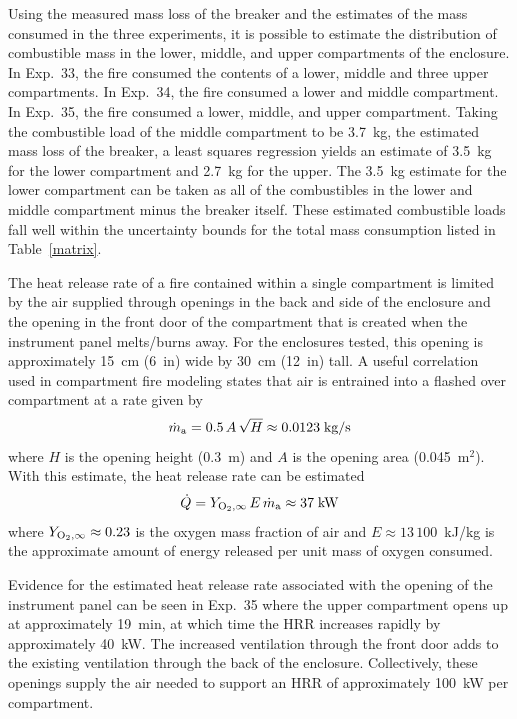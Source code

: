 \documentclass[12pt]{article}
\begin{document}
Using the measured mass loss of the breaker and the estimates of the mass consumed in the three experiments, it is possible to estimate the distribution of combustible mass in the lower, middle, and upper compartments of the enclosure. In Exp.~33, the fire consumed the contents of a lower, middle and three upper compartments. In Exp.~34, the fire consumed a lower and middle compartment. In Exp.~35, the fire consumed a lower, middle, and upper compartment. Taking the combustible load of the middle compartment to be 3.7~kg, the estimated mass loss of the breaker, a least squares regression yields an estimate of 3.5~kg for the lower compartment and 2.7~kg for the upper. The 3.5~kg estimate for the lower compartment can be taken as all of the combustibles in the lower and middle compartment minus the breaker itself. These estimated combustible loads fall well within the uncertainty bounds for the total mass consumption listed in Table~\ref{matrix}.

The heat release rate of a fire contained within a single compartment is limited by the air supplied through openings in the back and side of the enclosure and the opening in the front door of the compartment that is created when the instrument panel melts/burns away. For the enclosures tested, this opening is approximately 15~cm (6~in) wide by 30~cm (12~in) tall. A useful correlation~\cite{SFPE:Walton} used in compartment fire modeling states that air is entrained into a flashed over compartment at a rate given by
\begin{equation}
   \dot{m}_{\rm a} = 0.5  \, A \, \sqrt{H}  \approx 0.0123 \; \hbox{kg/s}
\end{equation}
where $H$ is the opening height (0.3~m) and $A$ is the opening area (0.045~m$^2$). With this estimate, the heat release rate can be estimated
\begin{equation}
   \dot{Q} = Y_{\rm O_2,\infty} \, E \, \dot{m}_{\rm a} \approx 37 \; \hbox{kW}
\end{equation}
where $Y_{\rm O_2,\infty}\approx 0.23$ is the oxygen mass fraction of air and $E\approx 13\,100$~kJ/kg is the approximate amount of energy released per unit mass of oxygen consumed.

Evidence for the estimated heat release rate associated with the opening of the instrument panel can be seen in Exp.~35 where the upper compartment opens up at approximately 19~min, at which time the HRR increases rapidly by approximately 40~kW. The increased ventilation through the front door adds to the existing ventilation through the back of the enclosure. Collectively, these openings supply the air needed to support an HRR of approximately 100~kW per compartment.
\end{document}
